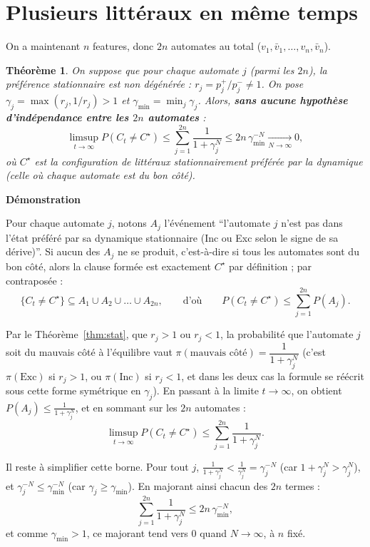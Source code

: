 \documentclass[11pt]{article}
\newtheorem{theorem}{Théorème}
\begin{document}
\section{Plusieurs littéraux en même temps}

On a maintenant $n$ features, donc $2n$ automates au total ($v_1, \bar v_1, \dots, v_n, \bar v_n$).

\begin{theorem}\label{thm:multi}
On suppose que pour chaque automate $j$ (parmi les $2n$), la préférence stationnaire est non dégénérée : $r_j = p_j^+/p_j^- \ne 1$. On pose $\gamma_j = \max(r_j, 1/r_j) > 1$ et $\gamma_{\min} = \min_j \gamma_j$. Alors, \textbf{sans aucune hypothèse d'indépendance entre les $2n$ automates} :
$$\limsup_{t\to\infty} P(C_t \ne C^\star) \le \sum_{j=1}^{2n} \frac{1}{1+\gamma_j^N} \le 2n \, \gamma_{\min}^{-N} \xrightarrow[N\to\infty]{} 0,$$
où $C^\star$ est la configuration de littéraux stationnairement préférée par la dynamique (celle où chaque automate est du bon côté).
\end{theorem}

\textbf{Démonstration}

Pour chaque automate $j$, notons $A_j$ l'événement ``l'automate $j$ n'est pas dans l'état préféré par sa dynamique stationnaire (Inc ou Exc selon le signe de sa dérive)''. Si aucun des $A_j$ ne se produit, c'est-à-dire si tous les automates sont du bon côté, alors la clause formée est exactement $C^\star$ par définition ; par contraposée :
$$\{C_t \ne C^\star\} \subseteq A_1 \cup A_2 \cup \dots \cup A_{2n}, \qquad \text{d'où} \qquad P(C_t \ne C^\star) \le \sum_{j=1}^{2n} P(A_j).$$

Par le Théorème~\ref{thm:stat}, que $r_j > 1$ ou $r_j < 1$, la probabilité que l'automate $j$ soit du mauvais côté à l'équilibre vaut $\pi(\text{mauvais côté}) = \dfrac{1}{1+\gamma_j^N}$ (c'est $\pi(\text{Exc})$ si $r_j>1$, ou $\pi(\text{Inc})$ si $r_j<1$, et dans les deux cas la formule se réécrit sous cette forme symétrique en $\gamma_j$). En passant à la limite $t\to\infty$, on obtient $P(A_j) \le \frac{1}{1+\gamma_j^N}$, et en sommant sur les $2n$ automates :
$$\limsup_{t\to\infty} P(C_t \ne C^\star) \le \sum_{j=1}^{2n} \frac{1}{1+\gamma_j^N}.$$

Il reste à simplifier cette borne. Pour tout $j$, $\frac{1}{1+\gamma_j^N} < \frac{1}{\gamma_j^N} = \gamma_j^{-N}$ (car $1+\gamma_j^N > \gamma_j^N$), et $\gamma_j^{-N} \le \gamma_{\min}^{-N}$ (car $\gamma_j \ge \gamma_{\min}$). En majorant ainsi chacun des $2n$ termes :
$$\sum_{j=1}^{2n} \frac{1}{1+\gamma_j^N} \le 2n\,\gamma_{\min}^{-N},$$
et comme $\gamma_{\min} > 1$, ce majorant tend vers $0$ quand $N \to \infty$, à $n$ fixé.
\end{document}
